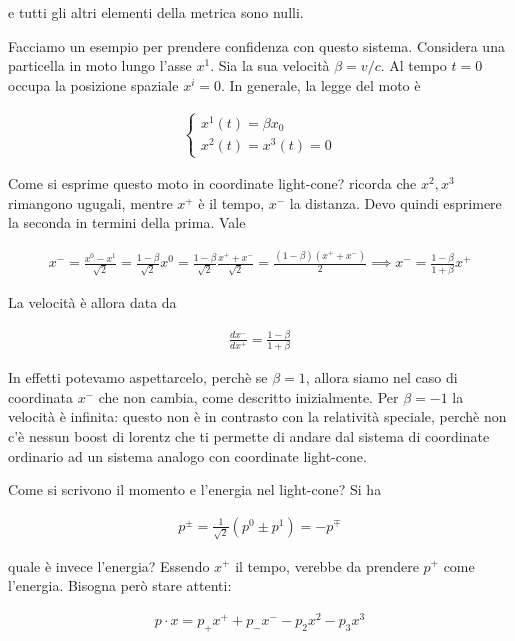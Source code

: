 \documentclass{report}
\begin{document}
e tutti gli altri elementi della metrica sono nulli. 

Facciamo un esempio per prendere confidenza con questo sistema. Considera una particella in moto lungo l'asse \(x^1\). Sia la sua velocità \(\beta = v/c\). Al tempo \(t = 0\) occupa la posizione spaziale \(x^i = 0\). In generale, la legge del moto è 

\begin{align}
    \begin{cases}
        x^1(t) = \beta x_0 \\ x^2(t) = x^3(t) = 0 
    \end{cases}
\end{align}

Come si esprime questo moto in coordinate light-cone? ricorda che \(x^2, x^3\) rimangono ugugali, mentre \(x^+\) è il tempo, \(x^-\) la distanza. Devo quindi esprimere la seconda in termini della prima. Vale 

\begin{align}
    x^- = \frac{x^0 - x^1}{\sqrt{2}} = \frac{1-\beta}{\sqrt{2}}x^0 = \frac{1-\beta}{\sqrt{2}}\frac{x^+ + x^-}{\sqrt{2}} = \frac{(1-\beta)(x^+ + x^-)}{2} \implies x^- = \frac{1-\beta}{1+\beta}x^+
\end{align}

La velocità è allora data da 

\begin{align}
    \frac{d x^-}{dx^+} = \frac{1-\beta}{1+\beta}
\end{align}

In effetti potevamo aspettarcelo, perchè se \(\beta = 1\), allora siamo nel caso di coordinata \(x^-\) che non cambia, come descritto inizialmente. Per \(\beta = -1\) la velocità è infinita: questo non è in contrasto con la relatività speciale, perchè non c'è nessun boost di lorentz che ti permette di andare dal sistema di coordinate ordinario ad un sistema analogo con coordinate light-cone. 

Come si scrivono il momento e l'energia nel light-cone? Si ha 

\begin{align}
    p^\pm = \frac{1}{\sqrt{2}}(p^0 \pm p^1) = -p^\mp 
\end{align}

quale è invece l'energia? Essendo \(x^+\) il tempo, verebbe da prendere \(p^+\) come l'energia. Bisogna però stare attenti: 

\begin{align}
    p\cdot x = p_+ x^+ + p_-x^- - p_2x^2 - p_3 x^3 
\end{align}
\end{document}
